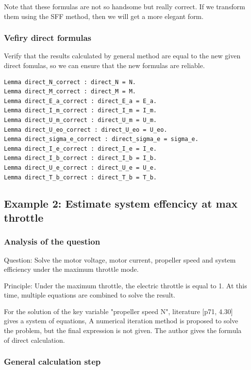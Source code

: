 \documentclass{article} %
\numberwithin{equation}{section} %
\begin{document}
Note that these formulas are not so handsome but really correct.
If we transform them using the SFF method, then we will get a more elegant form.

\subsubsection{Vefiry direct formulas}

Verify that the results calculated by general method are equal to the new given direct fomulas, 
so we can ensure that the new formulas are reliable.

\begin{verbatim}
Lemma direct_N_correct : direct_N = N.
Lemma direct_M_correct : direct_M = M.
Lemma direct_E_a_correct : direct_E_a = E_a.
Lemma direct_I_m_correct : direct_I_m = I_m.
Lemma direct_U_m_correct : direct_U_m = U_m.
Lemma direct_U_eo_correct : direct_U_eo = U_eo.
Lemma direct_sigma_e_correct : direct_sigma_e = sigma_e.
Lemma direct_I_e_correct : direct_I_e = I_e.
Lemma direct_I_b_correct : direct_I_b = I_b.
Lemma direct_U_e_correct : direct_U_e = U_e.
Lemma direct_T_b_correct : direct_T_b = T_b.
\end{verbatim}

\newpage

\subsection{Example 2: Estimate system effencicy at max throttle}

\subsubsection{Analysis of the question}
Question: Solve the motor voltage, motor current, propeller speed and system efficiency under the maximum throttle mode.

Principle: Under the maximum throttle, the electric throttle is equal to 1. 
At this time, multiple equations are combined to solve the result.

For the solution of the key variable "propeller speed N", literature \cite{qq}[p71, 4.30] gives a system of equations,
A numerical iteration method is proposed to solve the problem, but the final expression is not given.
The author gives the formula of direct calculation.


\subsubsection{General calculation step}
\end{document}
